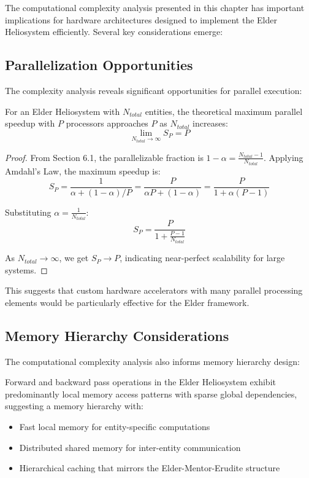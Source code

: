The computational complexity analysis presented in this chapter has important implications for hardware architectures designed to implement the Elder Heliosystem efficiently. Several key considerations emerge:

\subsection{Parallelization Opportunities}

The complexity analysis reveals significant opportunities for parallel execution:

\begin{theorem}
For an Elder Heliosystem with $N_{total}$ entities, the theoretical maximum parallel speedup with $P$ processors approaches $P$ as $N_{total}$ increases:
\begin{equation}
\lim_{N_{total} \to \infty} S_P = P
\end{equation}
\end{theorem}

\begin{proof}
From Section 6.1, the parallelizable fraction is $1 - \alpha = \frac{N_{total} - 1}{N_{total}}$. Applying Amdahl's Law, the maximum speedup is:
\begin{equation}
S_P = \frac{1}{\alpha + (1-\alpha)/P} = \frac{P}{\alpha P + (1-\alpha)} = \frac{P}{1 + \alpha(P-1)}
\end{equation}

Substituting $\alpha = \frac{1}{N_{total}}$:
\begin{equation}
S_P = \frac{P}{1 + \frac{P-1}{N_{total}}}
\end{equation}

As $N_{total} \to \infty$, we get $S_P \to P$, indicating near-perfect scalability for large systems.
\end{proof}

This suggests that custom hardware accelerators with many parallel processing elements would be particularly effective for the Elder framework.

\subsection{Memory Hierarchy Considerations}

The computational complexity analysis also informs memory hierarchy design:

\begin{theorem}
Forward and backward pass operations in the Elder Heliosystem exhibit predominantly local memory access patterns with sparse global dependencies, suggesting a memory hierarchy with:
\begin{itemize}
    \item Fast local memory for entity-specific computations
    \item Distributed shared memory for inter-entity communication
    \item Hierarchical caching that mirrors the Elder-Mentor-Erudite structure
\end{itemize}
\end{theorem}

